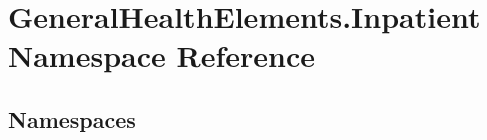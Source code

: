 \hypertarget{namespace_general_health_elements_1_1_inpatient}{}\section{General\+Health\+Elements.\+Inpatient Namespace Reference}
\label{namespace_general_health_elements_1_1_inpatient}
\subsection*{Namespaces}
\begin{DoxyCompactItemize}
\end{DoxyCompactItemize}
